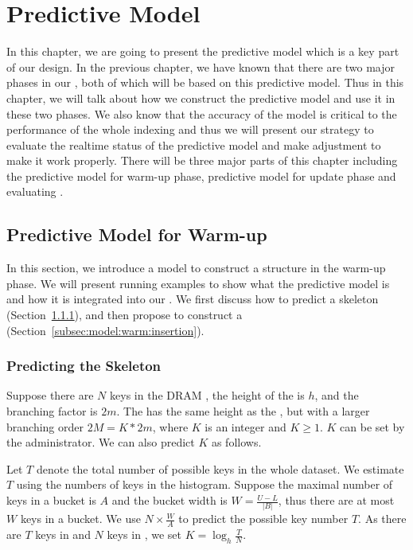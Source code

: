 \chapter{Predictive Model}
\label{sec:model}

In this chapter, we are going to present the predictive model which is a key part of our design. 
In the previous chapter, we have known that there are two major phases in our \bptree, both of
which will be based on this predictive model. Thus in this chapter, we will talk about how we 
construct the predictive model and use it in these two phases. We also know that the accuracy of 
the model is critical to the performance of the whole indexing and thus we will present our strategy 
to evaluate the realtime status of the predictive model and make adjustment to make it work properly. 
There will be three major parts of this chapter including the predictive model for warm-up phase, 
predictive model for update phase and evaluating \bptree. 

\section{Predictive Model for Warm-up} \label{sec:model:warm}


In this section, we introduce a \predict model to construct a \bptree structure in the warm-up phase. We will present running examples to show what the predictive model is and how it is integrated into our \bptree. We first discuss how to predict a \bptree skeleton (Section~\ref{subsec:model:warm:skeleton}), and then propose to construct a \bptree (Section~\ref{subsec:model:warm:insertion}).

\subsection{Predicting the {\large \bptree} Skeleton} \label{subsec:model:warm:skeleton}



Suppose there are $N$ keys in the DRAM \bplustree, the height of the \bplustree is $h$, and the branching factor is $2m$. The \bptree has the same height as the \bplustree, but with a larger branching order $2M=K*2m$, where $K$ is an integer and $K \ge 1$. $K$ can be set by the administrator. We can also predict $K$ as follows.

Let $T$ denote the total number of possible keys in the whole dataset. We  estimate $T$ using the numbers of keys in the histogram. Suppose the maximal number of keys in a bucket is $A$ and the bucket width is $W=\frac{U-L}{|B|}$, thus there are at most $W$ keys in a bucket. We use $N\times \frac{W}{A}$ to predict the possible key number $T$. As there are $T$ keys in \bptree and $N$ keys in \bplustree, we set $K=\log_h \frac{T}{N}$.


